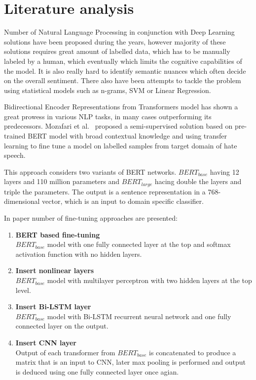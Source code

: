 \documentclass[a4paper]{article}
\begin{document}
\section{Literature analysis}
Number of Natural Language Processing in conjunction with Deep Learning solutions have been proposed during the years, however majority of these solutions requires great amount of labelled data, which has to be manually labeled by a human, which eventually which limits the cognitive capabilities of the model. It is also really hard to identify semantic nuances which often decide on the overall sentiment. There also have been attempts to tackle the problem using statistical models such as n-grams, SVM or Linear Regression.
\par
Bidirectional Encoder Representations from Transformers model has shown a great prowess in various NLP tasks, in many cases outperforming its predecessors.
Mozafari et al.~\cite{paper} proposed a semi-supervised solution based on pre-trained BERT model with broad contextual knowledge and using transfer learning to fine tune a model on labelled samples from target domain of hate speech. 
\par
This approach considers two variants of BERT networks. $BERT_{base}$ having 12 layers and 110 million parameters and $BERT_{large}$ hacing double the layers and triple the parameters. The output is a sentence representation in a 768-dimensional vector, which is an input to domain specific classifier.
\par
In paper number of fine-tuning approaches are presented:
\begin{enumerate}
    \item \textbf{BERT based fine-tuning} \\
    $BERT_{base}$ model with one fully connected layer at the top and softmax activation function with no hidden layers.
    \item \textbf{Insert nonlinear layers} \\
    $BERT_{base}$ model with multilayer perceptron with two hidden layers at the top level.
    \item \textbf{Insert Bi-LSTM layer} \\
    $BERT_{base}$ model with Bi-LSTM recurrent neural network and one fully connected layer on the output.
    \item \textbf{Insert CNN layer} \\
    Output of each transformer from $BERT_{base}$ is concatenated to produce a matrix that is an input to CNN, later max pooling is performed and output is deduced using one fully connected layer once agian.
\end{enumerate}
\end{document}
